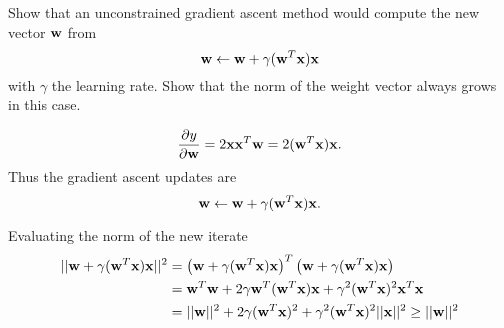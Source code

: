 \begin{enumerate}
  Show that an unconstrained gradient ascent method would compute the
  new vector ${\bf w}$ from
  \[
  {\bf w} \leftarrow {\bf w} + \gamma ({\bf w}^T{\bf x}){\bf x}
  \]
  with $\gamma$ the learning rate. Show that the norm of the weight
  vector always grows in this case.

  \begin{solution}


    \begin{equation*}
      \frac{\partial y}{\partial \mathbf{w}} = 2 \mathbf{x} \mathbf{x}^T \mathbf{w} = 2 (\mathbf{w}^T \mathbf{x}) \mathbf{x}.
    \end{equation*}
    Thus the gradient ascent updates are
    \begin{equation*}
      \mathbf{w} \leftarrow \mathbf{w} + \gamma (\mathbf{w}^T \mathbf{x}) \mathbf{x}.
    \end{equation*}

    Evaluating the norm of the new iterate
    \begin{equation*}
      \begin{split}
        ||\mathbf{w} + \gamma (\mathbf{w}^T \mathbf{x}) \mathbf{x}||^2
        &= \left(\mathbf{w} + \gamma (\mathbf{w}^T \mathbf{x}) \mathbf{x}\right)^T
        \left(\mathbf{w} + \gamma (\mathbf{w}^T \mathbf{x}) \mathbf{x}\right) \\
        &= \mathbf{w}^T \mathbf{w} + 2 \gamma \mathbf{w}^T (\mathbf{w}^T \mathbf{x}) \mathbf{x} + \gamma^2 (\mathbf{w}^T \mathbf{x})^2 \mathbf{x}^T \mathbf{x} \\
        &= ||\mathbf{w}||^2 + 2 \gamma (\mathbf{w}^T \mathbf{x})^2 + \gamma^2 (\mathbf{w}^T \mathbf{x})^2 ||\mathbf{x}||^2
        \ge ||\mathbf{w}||^2
      \end{split}
    \end{equation*}

  \end{solution}
  
\end{enumerate}

